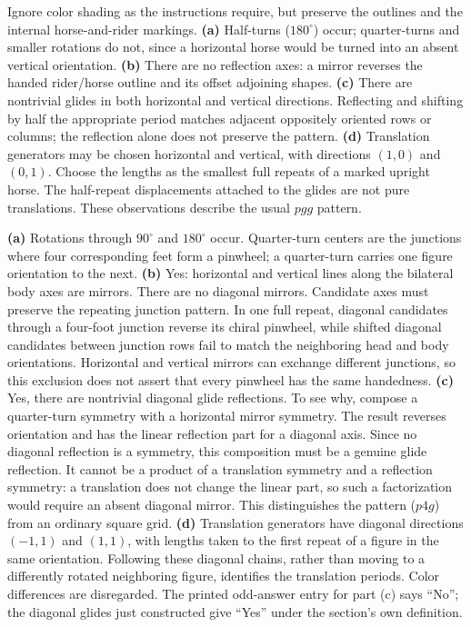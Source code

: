 Ignore color shading as the instructions require, but preserve the outlines and the internal horse-and-rider markings.
\textbf{(a)} Half-turns ($180^\circ$) occur; quarter-turns and smaller rotations do not, since a horizontal horse would be turned into an absent vertical orientation. \textbf{(b)} There are no reflection axes: a mirror reverses the handed rider/horse outline and its offset adjoining shapes. \textbf{(c)} There are nontrivial glides in both horizontal and vertical directions. Reflecting and shifting by half the appropriate period matches adjacent oppositely oriented rows or columns; the reflection alone does not preserve the pattern. \textbf{(d)} Translation generators may be chosen horizontal and vertical, with directions $(1,0)$ and $(0,1)$. Choose the lengths as the smallest full repeats of a marked upright horse. The half-repeat displacements attached to the glides are not pure translations. These observations describe the usual $pgg$ pattern.

\textbf{(a)} Rotations through $90^\circ$ and $180^\circ$ occur. Quarter-turn centers are the junctions where four corresponding feet form a pinwheel; a quarter-turn carries one figure orientation to the next. \textbf{(b)} Yes: horizontal and vertical lines along the bilateral body axes are mirrors. There are no diagonal mirrors. Candidate axes must preserve the repeating junction pattern. In one full repeat, diagonal candidates through a four-foot junction reverse its chiral pinwheel, while shifted diagonal candidates between junction rows fail to match the neighboring head and body orientations. Horizontal and vertical mirrors can exchange different junctions, so this exclusion does not assert that every pinwheel has the same handedness. \textbf{(c)} Yes, there are nontrivial diagonal glide reflections. To see why, compose a quarter-turn symmetry with a horizontal mirror symmetry. The result reverses orientation and has the linear reflection part for a diagonal axis. Since no diagonal reflection is a symmetry, this composition must be a genuine glide reflection. It cannot be a product of a translation symmetry and a reflection symmetry: a translation does not change the linear part, so such a factorization would require an absent diagonal mirror. This distinguishes the pattern ($p4g$) from an ordinary square grid. \textbf{(d)} Translation generators have diagonal directions $(-1,1)$ and $(1,1)$, with lengths taken to the first repeat of a figure in the same orientation. Following these diagonal chains, rather than moving to a differently rotated neighboring figure, identifies the translation periods. Color differences are disregarded. The printed odd-answer entry for part (c) says ``No''; the diagonal glides just constructed give ``Yes'' under the section's own definition.

